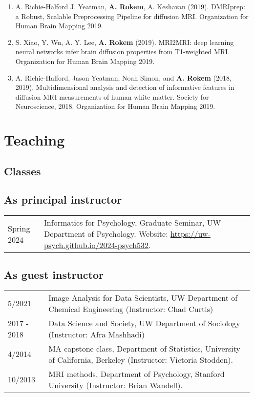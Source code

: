 \documentclass[11pt,fullpage]{article}
\begin{document}
\begin{enumerate}
\item A. Richie-Halford J. Yeatman, {\bf A. Rokem}, A. Keshavan (2019).
DMRIprep: a Robust, Scalable Preprocessing Pipeline for diffusion MRI.
Organization for Human Brain Mapping 2019.

\item S. Xiao, Y. Wu, A. Y. Lee, {\bf A. Rokem} (2019). MRI2MRI: deep learning
neural networks infer brain diffusion properties from T1-weighted MRI. Organization for Human Brain Mapping 2019.

\item A. Richie-Halford, Jason Yeatman, Noah Simon, and {\bf A. Rokem} (2018, 2019). Multidimensional analysis and detection of informative features in diffusion MRI measurements of human white matter. Society for Neuroscience, 2018. Organization for Human Brain Mapping 2019.

\end{enumerate}

\section*{Teaching}

\subsection*{Classes}

\subsection*{As principal instructor}
\begin{tabular}{p{}p{}}
Spring 2024 & Informatics for Psychology, Graduate Seminar, UW Department of Psychology. Website: \url{https://uw-psych.github.io/2024-psych532}. \\
\end{tabular}
\subsection*{As guest instructor}
\begin{tabular}{p{}p{}}
5/2021 & Image Analysis for Data Scientists,  UW Department of Chemical Engineering (Instructor: Chad Curtis) \\
2017 - 2018 & Data Science and Society, UW Department of Sociology (Instructor: Afra Mashhadi) \\
4/2014 & MA capstone class, Department of Statistics, University of California, Berkeley (Instructor: Victoria Stodden).\\
10/2013 & MRI methods, Department of Psychology, Stanford University (Instructor: Brian Wandell).\\
\end{tabular}
\end{document}
